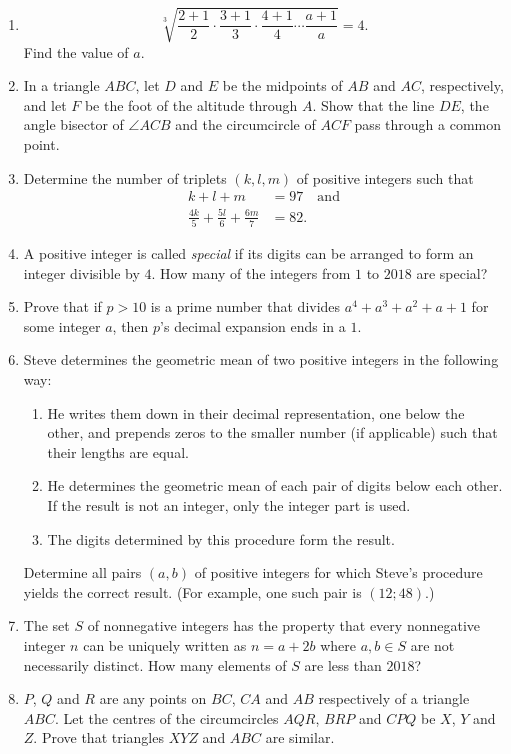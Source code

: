 \documentclass{article}
\begin{document}
\begin{enumerate}[1.]

\item %
\[ \sqrt[3]{\frac{2+1}{2}\cdot\frac{3+1}{3}\cdot\frac{4+1}{4}\dotsm\frac{a+1}{a}} = 4. \]
Find the value of $a$.


\item %
In a triangle $ABC$, let $D$ and $E$ be the midpoints of $AB$ and $AC$, respectively, and let $F$ be the foot of the altitude through $A$. Show that the line $DE$, the angle bisector of $\angle ACB$ and the circumcircle of $ACF$ pass through a common point.


\item %
Determine the number of triplets $(k,l,m)$ of positive integers such that
\begin{align*}
  k+l+m &= 97 \quad \mathrm{and} \\
  \frac{4k}{5} +\frac{5l}{6} +\frac{6m}{7} &= 82.
\end{align*}


\item %
A positive integer is called \emph{special} if its digits can be arranged to form an integer divisible by $4$. How many of the integers from $1$ to $2018$ are special?


\item %
Prove that if $p > 10$ is a prime number that divides $a^4+a^3+a^2+a+1$ for some integer $a$, then $p$'s decimal expansion ends in a $1$.


\item %
Steve determines the geometric mean of two positive integers in the following way:
\begin{enumerate}
	\item He writes them down in their decimal representation, one below the other, and prepends zeros to the smaller number (if applicable) such that their lengths are equal.
	\item He determines the geometric mean of each pair of digits below each other. If the result is not an integer, only the integer part is used.
	\item The digits determined by this procedure form the result.
\end{enumerate}
Determine all pairs $(a,b)$ of positive integers for which Steve's procedure yields the correct result. (For example, one such pair is $(12; 48)$.)


\item %
The set $S$ of nonnegative integers has the property that every nonnegative integer $n$ can be uniquely written as $n = a+2b$ where $a,b \in S$ are not necessarily distinct. How many elements of $S$ are less than $2018$?


\item %
$P$, $Q$ and $R$ are any points on $BC$, $CA$ and $AB$ respectively of a triangle $ABC$. Let the centres of the circumcircles $AQR$, $BRP$ and $CPQ$ be $X$, $Y$ and $Z$. Prove that triangles $XYZ$ and $ABC$ are similar.


\end{enumerate}
\end{document}
